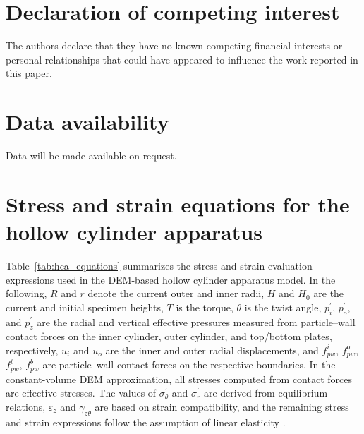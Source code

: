 \documentclass[a4paper,fleqn]{cas-sc}
\begin{document}
\section*{Declaration of competing interest}
The authors declare that they have no known competing financial interests or
personal relationships that could have appeared to influence the work reported
in this paper.

\section*{Data availability}
Data will be made available on request.



\printcredits

\appendix
\section{Stress and strain equations for the hollow cylinder apparatus}
\label{sec:appendix_hca}

Table~\ref{tab:hca_equations} summarizes the stress and strain evaluation expressions used in the DEM-based hollow cylinder apparatus model. In the following, $R$ and $r$ denote the current outer and inner radii, $H$ and $H_0$ are the current and initial specimen heights, $T$ is the torque, $\theta$ is the twist angle, $p_i^{\prime}$, $p_o^{\prime}$, and $p_z^{\prime}$ are the radial and vertical effective pressures measured from particle--wall contact forces on the inner cylinder, outer cylinder, and top/bottom plates, respectively, $u_i$ and $u_o$ are the inner and outer radial displacements, and $f_{pw}^{i}$, $f_{pw}^{o}$, $f_{pw}^{t}$, $f_{pw}^{b}$ are particle--wall contact forces on the respective boundaries. In the constant-volume DEM approximation, all stresses computed from contact forces are effective stresses. The values of $\sigma_\theta^{\prime}$ and $\sigma_r^{\prime}$ are derived from equilibrium relations, $\varepsilon_z$ and $\gamma_{z\theta}$ are based on strain compatibility, and the remaining stress and strain expressions follow the assumption of linear elasticity \citep{Hight1983}.
\end{document}
